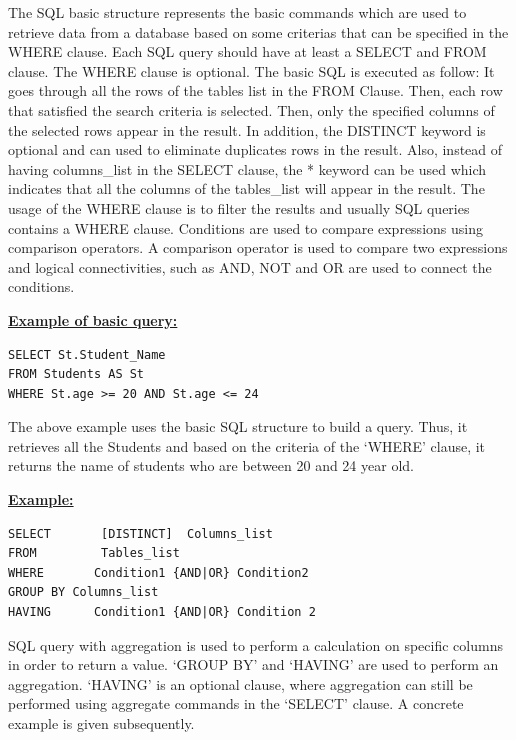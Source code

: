  
The SQL basic structure represents the basic commands which are used to retrieve data from a database based on some criterias that can be specified in the WHERE clause. Each SQL query should have at least a SELECT and FROM clause.  The WHERE clause is optional. The basic SQL is executed as follow: It goes through all the rows of the tables list in the FROM Clause. Then, each row that satisfied the search criteria is selected. Then, only the specified columns of the selected rows appear in the result. In addition,  the DISTINCT keyword is optional and can used to eliminate duplicates rows in the result. Also, instead of having columns\_list in the SELECT clause, the * keyword can be used which indicates that all the columns of the tables\_list will appear in the result. The usage of the WHERE clause is to filter the results and usually SQL queries contains a WHERE clause. Conditions are used to compare expressions using comparison operators. A comparison operator is used to compare two expressions and logical connectivities, such as AND, NOT and OR are used to connect the conditions. 

\hfill\newline
\noindent\textbf{\underline{Example of basic query:}}
\begin{mdframed}[backgroundcolor=gray!20] 
\begin{verbatim}
SELECT St.Student_Name
FROM Students AS St 
WHERE St.age >= 20 AND St.age <= 24
\end{verbatim}
\end{mdframed}

The above example uses the basic SQL structure to build a query. Thus, it retrieves all the Students and based on the criteria of the ‘WHERE’ clause, it returns the name of students who are between 20 and 24 year old. 

\hfill\newline
\noindent\textbf{\underline{Example:}}
\begin{mdframed}[backgroundcolor=lightgray!20] 
\begin{lstlisting}[style=SQL]
SELECT       [DISTINCT]  Columns_list
FROM         Tables_list
WHERE       Condition1 {AND|OR} Condition2
GROUP BY Columns_list
HAVING      Condition1 {AND|OR} Condition 2
\end{lstlisting}
\end{mdframed}

SQL query with aggregation is used to perform a calculation on specific columns in order to return a value. ‘GROUP BY’ and ‘HAVING’ are used to perform an aggregation. ‘HAVING’ is an optional clause, where aggregation can still be performed using aggregate commands in the ‘SELECT’ clause. A concrete example is given subsequently. 
 

